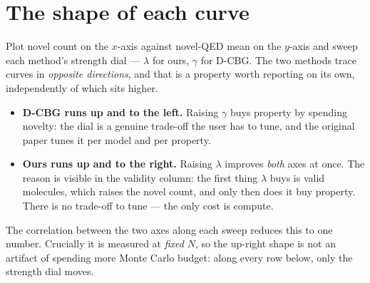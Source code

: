 \documentclass[11pt]{article}
\begin{document}
\section{The shape of each curve}

Plot novel count on the $x$-axis against novel-QED mean on the $y$-axis and
sweep each method's strength dial --- $\lambda$ for ours, $\gamma$ for D-CBG.
The two methods trace curves in \emph{opposite directions}, and that is a
property worth reporting on its own, independently of which sits higher.

\begin{itemize}
  \item \textbf{D-CBG runs up and to the left.} Raising $\gamma$ buys
        property by spending novelty: the dial is a genuine trade-off the user
        has to tune, and the original paper tunes it per model and per property.
  \item \textbf{Ours runs up and to the right.} Raising $\lambda$ improves
        \emph{both} axes at once. The reason is visible in the validity
        column: the first thing $\lambda$ buys is valid molecules, which raises
        the novel count, and only then does it buy property. There is no
        trade-off to tune --- the only cost is compute.
\end{itemize}

The correlation between the two axes along each sweep reduces this to one
number. Crucially it is measured at \emph{fixed} $N$, so the up-right shape
is not an artifact of spending more Monte Carlo budget: along every row below,
only the strength dial moves.
\end{document}
